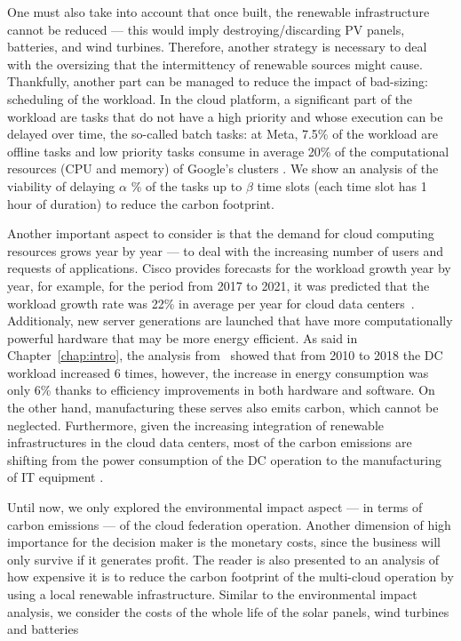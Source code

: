 One must also take into account that once built, the renewable infrastructure cannot be reduced --- this would imply destroying/discarding PV panels, batteries, and wind turbines. Therefore, another strategy is necessary to deal with the oversizing that the intermittency of renewable sources might cause. Thankfully, another part can be managed to reduce the impact of bad-sizing: scheduling of the workload. In the cloud platform, a significant part of the workload are tasks that do not have a high priority and whose execution can be delayed over time, the so-called batch tasks: at Meta, 7.5\% of the workload are offline tasks \cite{acun2022holistic} and low priority tasks consume in average 20\% of the computational resources (CPU and memory) of Google's clusters \cite{googleborg_2020}. We show an analysis of the viability of delaying $\alpha$ \% of the tasks up to $\beta$ time slots (each time slot has 1 hour of duration) to reduce the carbon footprint.

Another important aspect to consider is that the demand for cloud computing resources grows year by year --- to deal with the increasing number of users and requests of applications. Cisco provides forecasts for the workload growth year by year, for example, for the period from 2017 to 2021, it was predicted that the workload growth rate was 22\% in average per year for cloud data centers~\cite{cisco_global_cloud_index_2018}.  Additionaly, new server generations are launched that have more computationally powerful hardware that may be more energy efficient. As said in Chapter~\ref{chap:intro},  the analysis from~\citet{masanet2020recalibrating} showed that from 2010 to 2018 the DC workload increased 6 times, however, the increase in energy consumption was only 6\% thanks to efficiency improvements in both hardware and software. On the other hand, manufacturing these serves also emits carbon, which cannot be neglected. Furthermore, given the increasing integration of renewable infrastructures in the cloud data centers, most of the carbon emissions are shifting from the power consumption of the DC operation to the manufacturing of IT equipment \cite{gupta2021_chasingcarbon}.

Until now, we only explored the environmental impact aspect --- in terms of carbon emissions --- of the cloud federation operation. Another dimension of high importance for the decision maker is the monetary costs, since the business will only survive if it generates profit. The reader is also presented to an analysis of how expensive it is to reduce the carbon footprint of the multi-cloud operation by using a local renewable infrastructure. Similar to the environmental impact analysis, we consider the costs of the whole life of the solar panels, wind turbines and batteries

